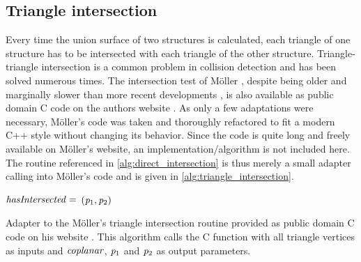 \subsection{Triangle intersection}
\label{sec:triangle_intersection}

Every time the union surface of two structures is calculated, each triangle of one structure has to be intersected with each triangle of the other structure.
Triangle-triangle intersection is a common problem in collision detection and has been solved numerous times.
The intersection test of Möller \cite{tri_tri_intersection_moller}, despite being older and marginally slower than more recent developments \cite{tri_tri_intersection_2}, is also available as public domain C code on the authors website \cite{tri_tri_intersection_moller_code}.
As only a few adaptations were necessary, Möller's code was taken and thoroughly refactored to fit a modern C++ style without changing its behavior.
Since the code is quite long and freely available on Möller's website, an implementation/algorithm is not included here.
The  routine referenced in \cref{alg:direct_intersection} is thus merely a small adapter calling into Möller's code and is given in \cref{alg:triangle_intersection}.

\begin{algorithm}
	\centering
	\begin{algorithmic}[1]
			\State $\mathit{hasIntersected} =$  
				\State \Return $(\mathit{p}_1, \mathit{p}_2)$ 
			\EndIf
		\EndFunction
	\end{algorithmic}
	\caption[Möller's triangle-triangle intersection adapter]{
		Adapter to the Möller's triangle intersection routine provided as public domain C code on his website \cite{tri_tri_intersection_moller_code}.
		This algorithm calls the C function  with all triangle vertices as inputs and $\mathit{coplanar}$, $\mathit{p}_1$ and $\mathit{p}_2$ as output parameters.
	}
	\label{alg:triangle_intersection}
\end{algorithm}

